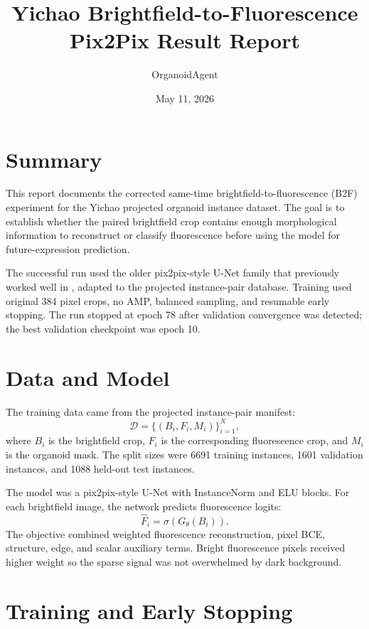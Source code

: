 \documentclass[11pt]{article}
\title{Yichao Brightfield-to-Fluorescence Pix2Pix Result Report}
\author{OrganoidAgent}
\date{May 11, 2026}
\begin{document}
\maketitle

\section*{Summary}

This report documents the corrected same-time brightfield-to-fluorescence (B2F) experiment for the Yichao projected organoid instance dataset. The goal is to establish whether the paired brightfield crop contains enough morphological information to reconstruct or classify fluorescence before using the model for future-expression prediction.

The successful run used the older pix2pix-style U-Net family that previously worked well in , adapted to the projected instance-pair database. Training used original 384 pixel crops, no AMP, balanced sampling, and resumable early stopping. The run stopped at epoch 78 after validation convergence was detected; the best validation checkpoint was epoch 10.

\section*{Data and Model}

The training data came from the projected instance-pair manifest:
\[
\mathcal{D}=\{(B_i,F_i,M_i)\}_{i=1}^N,
\]
where \(B_i\) is the brightfield crop, \(F_i\) is the corresponding fluorescence crop, and \(M_i\) is the organoid mask. The split sizes were 6691 training instances, 1601 validation instances, and 1088 held-out test instances.

The model was a pix2pix-style U-Net with InstanceNorm and ELU blocks. For each brightfield image, the network predicts fluorescence logits:
\[
\hat F_i=\sigma(G_\theta(B_i)).
\]
The objective combined weighted fluorescence reconstruction, pixel BCE, structure, edge, and scalar auxiliary terms. Bright fluorescence pixels received higher weight so the sparse signal was not overwhelmed by dark background.

\section*{Training and Early Stopping}
\end{document}
